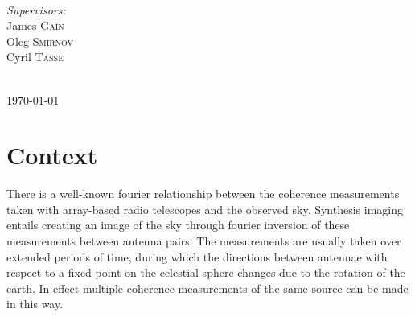 \documentclass[a4paper,10pt]{article}
\begin{document}
\begin{titlepage}
\begin{minipage}{0.4\textwidth}
\begin{flushleft}
\end{flushleft}
\end{minipage}
~
\begin{minipage}{0.4\textwidth}
\begin{flushright} \large
\emph{Supervisors:} \\
James \textsc{Gain} \\
Oleg \textsc{Smirnov} \\
Cyril \textsc{Tasse}\\
\end{flushright}
\end{minipage}\\[3cm]


{\large \today}\\[1.5cm] %
\vfill %

\end{titlepage}

\tableofcontents
\pagebreak
\listoffigures
\listoftables
\pagebreak
\section{Context}
There is a well-known fourier relationship between the coherence measurements taken with array-based radio telescopes and
the observed sky. Synthesis imaging entails creating an image of the sky through fourier inversion of these 
measurements between antenna pairs. The measurements are usually taken over extended periods of time, during which the 
directions between antennae with respect to a fixed point on the celestial sphere changes due to the rotation of the earth.
In effect multiple coherence measurements of the same source can be made in this way.
\end{document}
